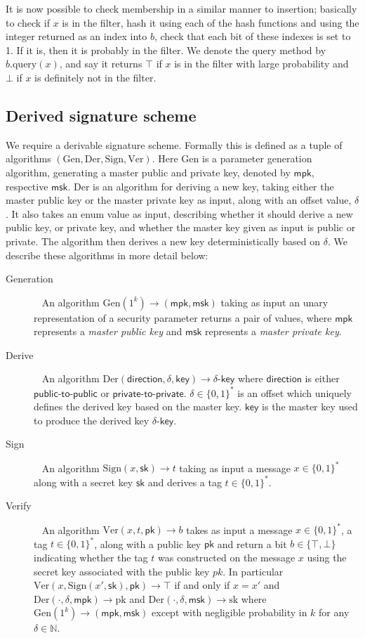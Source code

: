 \documentclass[11pt]{article} %
\newcommand{\mpk}{\ensuremath{\mathsf{mpk}}}
\newcommand{\msk}{\ensuremath{\mathsf{msk}}}
\newcommand{\query}{\ensuremath{\mathrm{query}}}
\begin{document}
It is now possible to check membership in a similar manner to insertion; basically to check if $x$ is in the filter, hash it using each of the hash functions and using the integer returned as an index into $b$, check that each bit of these indexes is set to 1. If it is, then it is probably in the filter. We denote the query method by $b.\query(x)$, and say it returns $\top$ if $x$ is in the filter with large probability and $\bot$ if $x$ is definitely not in the filter. 


\subsection{Derived signature scheme}
We require a derivable signature scheme. Formally this is defined as a tuple of algorithms $(\mathrm{Gen, Der, Sign, Ver})$. Here $\mathrm{Gen}$ is a parameter generation algorithm, generating a master public and private key, denoted by $\mpk$, respective $\msk$. $\mathrm{Der}$ is an algorithm for deriving a new key, taking either the master public key or the master private key as input, along with an offset value, $\delta$. It also takes an enum value as input, describing whether it should derive a new public key, or private key, and whether the master key given as input is public or private. The algorithm then derives a new key deterministically based on $\delta$.  We describe these algorithms in more detail below:
\begin{description}
	\item[Generation] ~ An algorithm $\mathrm{Gen}(1^k) \to (\mathsf{mpk}, \mathsf{msk})$ taking as input an unary representation of a security parameter returns a pair of values, where $\mpk$ represents a \emph{master public key} and $\msk$ represents a \emph{master private key}. 
	\item[Derive] ~ An algorithm $\mathrm{Der}(\mathsf{direction}, \delta, \mathsf{key})\to \delta\mbox{-}\mathsf{key}$ where $\mathsf{direction}$ is either $\mathsf{public}\mbox{-}\allowbreak\mathsf{to}\mbox{-}\mathsf{public}$ or $\mathsf{private}\mbox{-}\mathsf{to}\mbox{-}\mathsf{private}$. $\delta\in \{0,1\}^*$ is an offset which uniquely defines the derived key based on the master key.  $\mathsf{key}$ is the master key used to produce the derived key $\delta\mbox{-}\mathsf{key}$.
	\item[Sign] ~ An algorithm $\mathrm{Sign}(x, \mathsf{sk})\to t$ taking as input a message $x\in\{0,1\}^*$ along with a secret key $\mathsf{sk}$ and derives a tag $t\in\{0,1\}^*$.
	\item[Verify] ~ An algorithm $\mathrm{Ver}(x, t, \mathsf{pk}) \to b$ takes as input a message $x\in \{0,1\}^*$, a tag $t\in \{0,1\}^*$, along with a public key $\mathsf{pk}$ and return a bit $b\in\{\top, \bot\}$ indicating whether the tag $t$ was constructed on the message $x$ using the secret key associated with the public key $pk$. In particular $\mathrm{Ver}(x, \mathrm{Sign}(x', \mathsf{sk}), \mathsf{pk})\to \top$ if and only if $x=x'$ and $\mathrm{Der}(\cdot, \delta, \mathsf{mpk})\to \mathrm{pk}$ and $\mathrm{Der}(\cdot, \delta, \mathsf{\msk})\to \mathrm{sk}$ where $\mathrm{Gen}(1^k)\to (\mathsf{mpk}, \mathsf{msk})$ except with negligible probability in $k$ for any $\delta\in\mathbb{N}$.
\end{description}
\end{document}
